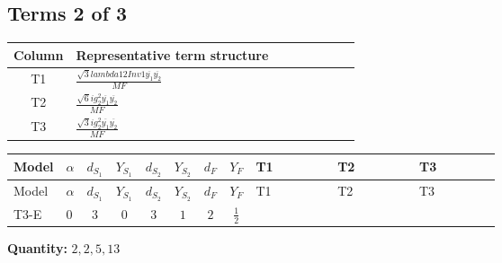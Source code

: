 \documentclass[8pt]{article}
\begin{document}
\begin{landscape}
\subsection*{Terms 2 of 3}
\begin{center}
\begin{tabular}{@{}c >{\raggedright\arraybackslash}p{0.82\linewidth}@{}}
\toprule
Column & Representative term structure \\
\midrule
T1 & \(\displaystyle \frac{\sqrt{3} lambda12Inv1 \overline{y_{1}} \overline{y_{2}}}{MF}\) \\
\midrule
T2 & \(\displaystyle \frac{\sqrt{6} i g_{2}^{2} \overline{y_{1}} \overline{y_{2}}}{MF}\) \\
\midrule
T3 & \(\displaystyle \frac{\sqrt{3} i g_{2}^{2} \overline{y_{1}} \overline{y_{2}}}{MF}\) \\
\midrule
\bottomrule
\end{tabular}
\end{center}
\smallskip
\tiny
\begin{longtable}{@{}llcccccc >{\raggedright\arraybackslash}p{0.21\linewidth} >{\raggedright\arraybackslash}p{0.21\linewidth} >{\raggedright\arraybackslash}p{0.21\linewidth}@{}}
\toprule
Model & $\alpha$ & $d_{S_1}$ & $Y_{S_1}$ & $d_{S_2}$ & $Y_{S_2}$ & $d_F$ & $Y_F$ & T1 & T2 & T3 \\
\midrule
\endfirsthead
\toprule
Model & $\alpha$ & $d_{S_1}$ & $Y_{S_1}$ & $d_{S_2}$ & $Y_{S_2}$ & $d_F$ & $Y_F$ & T1 & T2 & T3 \\
\midrule
\endhead
T3-E & $0$ & $3$ & $0$ & $3$ & $1$ & $2$ & $\frac{1}{2}$ & \scriptsize\adjustbox{max width=\linewidth}{$\begin{gathered} \frac{\sqrt{3} lambda12Inv1 \overline{y_{1}} \overline{y_{2}}}{6 MF}\end{gathered}$} & \scriptsize\adjustbox{max width=\linewidth}{$\begin{gathered} \frac{\sqrt{6} i g_{2}^{2} \overline{y_{1}} \overline{y_{2}}}{3 MF}\end{gathered}$} & \scriptsize\adjustbox{max width=\linewidth}{$\begin{gathered} \frac{\sqrt{3} i g_{2}^{2} \overline{y_{1}} \overline{y_{2}}}{6 MF}\end{gathered}$} \\
\midrule
\bottomrule
\end{longtable}
\clearpage
\noindent\textbf{Quantity: }$\mathrm{2,2,5,13}$\par\smallskip

\end{landscape}
\end{document}
